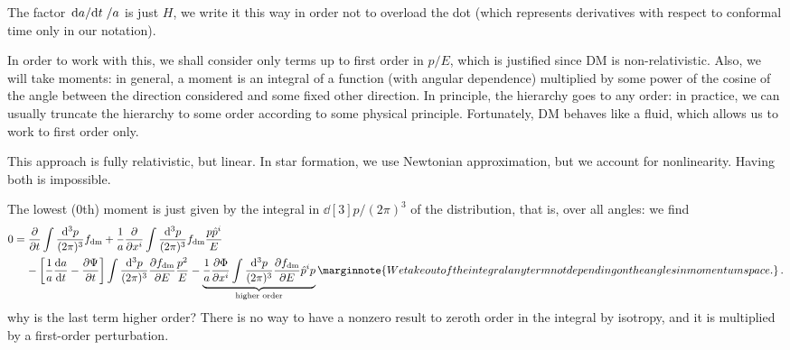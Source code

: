 \documentclass[main.tex]{subfiles}
\begin{document}
The factor \(\dv*{a}{t} / a\) is just \(H\), we write it this way in order not to overload the dot (which represents derivatives with respect to conformal time only in our notation). 

In order to work with this, we shall consider only terms up to first order in \(p / E\), which is justified since DM is non-relativistic. 
Also, we will take moments: in general, a moment is an integral of a function (with angular dependence) multiplied by some power of the cosine of the angle between the direction considered and some fixed other direction. 
In principle, the hierarchy goes to any order: in practice, we can usually truncate the hierarchy to some order according to some physical principle. 
Fortunately, DM behaves like a fluid, which allows us to work to first order only. 


This approach is fully relativistic, but linear. 
In star formation, we use Newtonian approximation, but we account for  nonlinearity.
Having both is impossible.

The lowest (0th) moment is just given by the integral in \(\dd[3]{p} / (2 \pi )^3\) of the distribution, that is, over all angles: we find 
%
\begin{subequations}
\begin{align}
\begin{split}
0&= \pdv{}{t} \int \frac{\dd[3]{p}}{(2 \pi )^3} f _{\text{dm}}
+ \frac{1}{a} \pdv{}{x^{i}} \int \frac{\dd[3]{p}}{(2 \pi )^3} f _{\text{dm}} \frac{p \hat{p}^{i}}{E} \\
&\phantom{=}\ 
- \qty[\frac{1}{a} \dv{a}{t} - \pdv{\Psi }{t}]
\int \frac{\dd[3]{p}}{(2 \pi )^3} \pdv{f _{\text{dm}}}{E} \frac{p^2}{E}
- \underbrace{\frac{1}{a} \pdv{\Phi }{x^{i}} \int \frac{\dd[3]{p}}{(2 \pi )^3} \pdv{f _{\text{dm}}}{E} \hat{p}^{i} p}_{\text{higher order}} 
\marginnote{We take out of the integral any term not depending on the angles in momentum space.}
\,.
\end{split}
\end{align}
\end{subequations}
%
why is the last term higher order? There is no way to have a nonzero result to zeroth order in the integral by isotropy, and it is multiplied by a first-order perturbation. 
\end{document}
